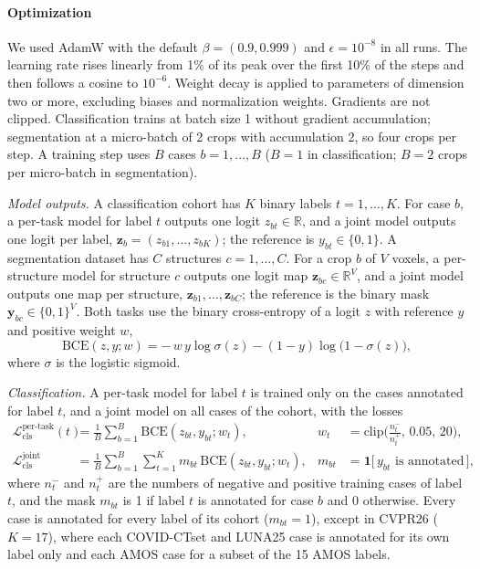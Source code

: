 \paragraph{Optimization} We used AdamW with the default $\beta=(0.9, 0.999)$ and $\epsilon=10^{-8}$ in all runs. The learning rate rises linearly from 1\% of its peak over the first 10\% of the steps and then follows a cosine to $10^{-6}$. Weight decay is applied to parameters of dimension two or more, excluding biases and normalization weights. Gradients are not clipped. Classification trains at batch size 1 without gradient accumulation; segmentation at a micro-batch of 2 crops with accumulation 2, so four crops per step. A training step uses $B$ cases $b=1,\dots,B$ ($B=1$ in classification; $B=2$ crops per micro-batch in segmentation).

\emph{Model outputs.} A classification cohort has $K$ binary labels $t=1,\dots,K$. For case $b$, a per-task model for label $t$ outputs one logit $z_{bt}\in\mathbb{R}$, and a joint model outputs one logit per label, $\bm{z}_b=(z_{b1},\dots,z_{bK})$; the reference is $y_{bt}\in\{0,1\}$. A segmentation dataset has $C$ structures $c=1,\dots,C$. For a crop $b$ of $V$ voxels, a per-structure model for structure $c$ outputs one logit map $\bm{z}_{bc}\in\mathbb{R}^{V}$, and a joint model outputs one map per structure, $\bm{z}_{b1},\dots,\bm{z}_{bC}$; the reference is the binary mask $\bm{y}_{bc}\in\{0,1\}^{V}$. Both tasks use the binary cross-entropy of a logit $z$ with reference $y$ and positive weight $w$,
\begin{equation}
\mathrm{BCE}(z, y; w)=-\,w\,y\log\sigma(z)-(1-y)\log\big(1-\sigma(z)\big),
\label{eq:bce}
\end{equation}
where $\sigma$ is the logistic sigmoid.

\emph{Classification.} A per-task model for label $t$ is trained only on the cases annotated for label $t$, and a joint model on all cases of the cohort, with the losses
\begin{subequations}\label{eq:lcls}
\begin{align}
\mathcal{L}^{\text{per-task}}_{\text{cls}}(t)&=\frac{1}{B}\sum_{b=1}^{B}\mathrm{BCE}(z_{bt}, y_{bt}; w_t), &
w_t&=\mathrm{clip}\Big(\frac{n^{-}_t}{n^{+}_t},\,0.05,\,20\Big), \label{eq:lcls_pt}\\
\mathcal{L}^{\text{joint}}_{\text{cls}}&=\frac{1}{B}\sum_{b=1}^{B}\sum_{t=1}^{K} m_{bt}\,\mathrm{BCE}(z_{bt}, y_{bt}; w_t), &
m_{bt}&=\mathbf{1}\big[\,y_{bt}\text{ is annotated}\,\big], \label{eq:lcls_joint}
\end{align}
\end{subequations}
where $n^{-}_t$ and $n^{+}_t$ are the numbers of negative and positive training cases of label $t$, and the mask $m_{bt}$ is 1 if label $t$ is annotated for case $b$ and 0 otherwise. Every case is annotated for every label of its cohort ($m_{bt}=1$), except in CVPR26 ($K=17$), where each COVID-CTset and LUNA25 case is annotated for its own label only and each AMOS case for a subset of the 15 AMOS labels.

